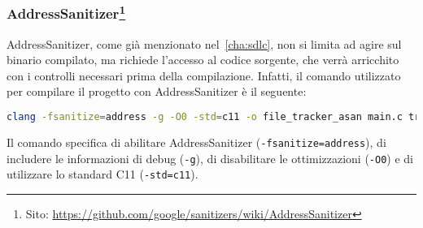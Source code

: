 \subsubsection*{\small AddressSanitizer\footnote{Sito: \url{https://github.com/google/sanitizers/wiki/AddressSanitizer}}}
AddressSanitizer, come già menzionato nel~\autoref{cha:sdlc}, non si limita ad agire
sul binario compilato, ma richiede l'accesso al codice sorgente, che verrà arricchito
con i controlli necessari prima della compilazione. Infatti, il comando utilizzato
per compilare il progetto con AddressSanitizer è il seguente:
\begin{lstlisting}[language=bash, numbers=none]
clang -fsanitize=address -g -O0 -std=c11 -o file_tracker_asan main.c tracker_core.c utils.c
\end{lstlisting}

Il comando specifica di abilitare AddressSanitizer (\texttt{-fsanitize=address}),
di includere le informazioni di debug (\texttt{-g}), di disabilitare le ottimizzazioni
(\texttt{-O0}) e di utilizzare lo standard C11 (\texttt{-std=c11}).

